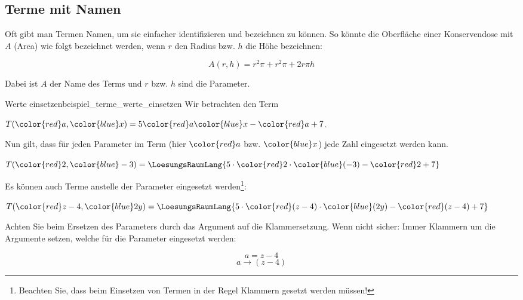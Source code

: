 


\TNTeop{}


\subsection{Terme mit Namen}
Oft gibt man Termen Namen, um sie einfacher identifizieren und
bezeichnen zu können. So könnte \zB die Oberfläche einer
Konservendose mit $A$ (Area) wie folgt bezeichnet werden, wenn $r$ den
Radius bzw. $h$ die Höhe bezeichnen:

$$A(r, h) = r^2\pi + r^2\pi + 2r\pi{}h$$

Dabei ist $A$ der Name des Terms und $r$ bzw. $h$ sind die Parameter.
\vspace{3mm}
\begin{beispiel}{Werte einsetzen}{beispiel_terme_werte_einsetzen}
  Wir betrachten den Term

  $T({\color{red}a}, {\color{blue}x}) = 5{\color{red}a}{\color{blue}x} - {\color{red}a} + 7$.

  Nun gilt, dass für jeden Parameter im Term (hier ${\color{red}a}$
  bzw. ${\color{blue}x}$) jede Zahl eingesetzt
  werden kann.\leserluft{}

  $T({\color{red}2}, {\color{blue}-3}) = \LoesungsRaumLang{5\cdot{}{\color{red}2}\cdot{\color{blue}(-3)} - {\color{red}2} + 7}$

  Es können auch Terme anstelle der Parameter eingesetzt
  werden\footnote{Beachten Sie, dass beim Einsetzen von Termen in der Regel
  Klammern gesetzt werden müssen!}:\leserluft{}

  $T({\color{red}z-4}, {\color{blue}2y}) =
  \LoesungsRaumLang{5 \cdot{} {\color{red}(z-4)} \cdot {\color{blue}(2y)} - {\color{red}(z-4)} + 7}$
\end{beispiel}

\begin{bemerkung}{}{}
Achten Sie beim Ersetzen des Parameters durch das Argument auf die
Klammersetzung. Wenn nicht sicher: Immer Klammern um die Argumente
setzen, welche für die Parameter eingesetzt werden:

$$ a = z-4$$
$$ a  \rightarrow (z-4)$$
\end{bemerkung}

